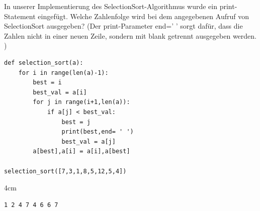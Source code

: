 \question[3]
In unserer Implementierung des SelectionSort-Algorithmus wurde ein print-Statement eingefügt.
Welche Zahlenfolge wird bei dem angegebenen Aufruf von SelectionSort ausgegeben?
(Der print-Parameter end=' ' sorgt dafür, dass die Zahlen nicht in einer neuen Zeile, 
sondern mit blank getrennt ausgegeben werden. )

\begin{lstlisting}
def selection_sort(a):
    for i in range(len(a)-1):
        best = i
        best_val = a[i]
        for j in range(i+1,len(a)):
            if a[j] < best_val:
                best = j
                print(best,end= ' ')
                best_val = a[j]
        a[best],a[i] = a[i],a[best]
        
selection_sort([7,3,1,8,5,12,5,4])

\end{lstlisting}
\begin{solutionbox}{4cm}
\begin{lstlisting}
1 2 4 7 4 6 6 7 
\end{lstlisting}
\end{solutionbox}
